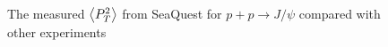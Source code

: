\documentclass[twocolumn,aps,unsortedaddress,superscriptaddress,prd,floatfix,showpacs,linenumbers]{revtex4-2}
\begin{document}
\begin{figure}
\caption{The measured $\expval{P_T^2}$ from SeaQuest for $p+p\rightarrow J/\psi$ compared with other experiments }
\label{fig:pt_s}
\end{figure}

\nocite{*}

\end{document}
